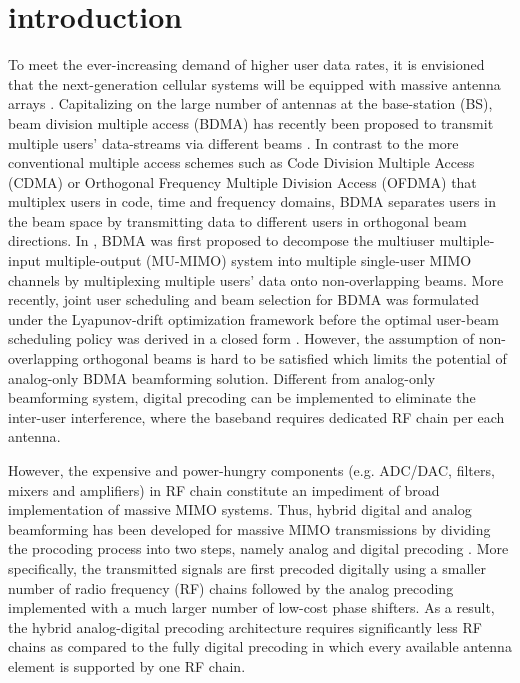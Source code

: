 \documentclass[conference]{IEEEtran}
\begin{document}
\section{introduction}
To meet the ever-increasing demand of higher user data rates, it is envisioned that the next-generation cellular systems will be equipped with massive antenna arrays \cite{boccardi2014five}. Capitalizing on the large number of antennas at the base-station (BS), beam division multiple access (BDMA) has recently been proposed to transmit multiple users' data-streams via different beams \cite{sun2015beam, Jiang2018}. In contrast to the more conventional multiple access schemes such as Code Division Multiple Access (CDMA) or Orthogonal Frequency Multiple Division Access (OFDMA) that multiplex users in code, time and frequency domains, BDMA separates users in the beam space by transmitting data to different users in orthogonal beam directions. In \cite{sun2015beam}, BDMA was first proposed to decompose the multiuser multiple-input multiple-output (MU-MIMO) system into multiple single-user MIMO channels by multiplexing multiple users' data onto non-overlapping beams. More recently, joint user scheduling and beam selection for BDMA was formulated under the Lyapunov-drift optimization framework before the optimal user-beam scheduling policy was derived in a closed form \cite{Jiang2018}. However, the assumption of non-overlapping orthogonal beams is hard to be satisfied which limits the potential of analog-only BDMA beamforming solution. Different from analog-only beamforming system, digital precoding can be implemented to eliminate the inter-user interference, where the baseband requires dedicated RF chain per each antenna\cite{bogale2014beamforming}.

However, the expensive and power-hungry components (e.g. ADC/DAC, filters, mixers and amplifiers) in RF chain constitute an impediment of broad implementation of massive MIMO systems.  Thus, hybrid digital and analog beamforming has been developed for massive MIMO transmissions by dividing the procoding process into two steps, namely analog and digital precoding \cite{han2015large, el2014spatially}. More specifically, the transmitted signals are first precoded digitally using a smaller number of radio frequency (RF) chains followed by the analog precoding implemented with a much larger number of low-cost phase shifters. As a result, the hybrid analog-digital precoding architecture requires significantly less RF chains as compared to the fully digital precoding in which every available antenna element is supported by one RF chain. 
\end{document}
